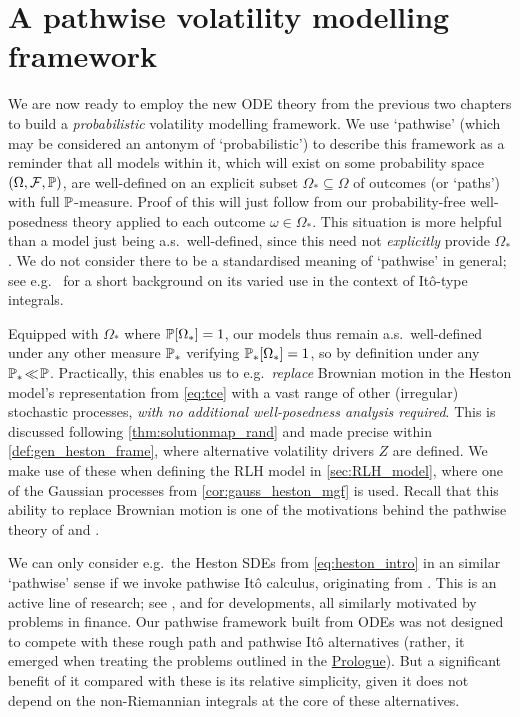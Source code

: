 \clearpage
\section{A pathwise volatility modelling framework}\label{chap:framework}

We are now ready to employ the new ODE theory from the previous two chapters to build a \emph{probabilistic} volatility modelling framework. We use `pathwise' (which may be considered an antonym of `probabilistic') to describe this framework as a reminder that all models within it, which will exist on some probability space $(\Omega,\mathcal{F},\mathbb{P})$, are well-defined on an explicit subset $\Omega_*\subseteq\Omega$ of outcomes (or `paths') with full $\mathbb{P}$-measure. Proof of this will just follow from our probability-free well-posedness theory applied to each outcome $\omega\in\Omega_*$. This situation is more helpful than a model just being a.s.~well-defined, since this need not \emph{explicitly} provide $\Omega_*$. We do not consider there to be a standardised meaning of `pathwise' in general; see e.g.~\cite{vovk_2016} for a short background on its varied use in the context of It\^o-type integrals.

Equipped with $\Omega_*$ where $\mathbb{P}[\Omega_*]=1$, our models thus remain a.s.~well-defined under any other measure $\mathbb{P}_*$ verifying $\mathbb{P}_*[\Omega_*]=1$, so by definition under any $\mathbb{P}_*\!\ll\!\mathbb{P}$. Practically, this enables us to e.g.~\emph{replace} Brownian motion in the Heston model's representation from \autoref{eq:tce} with a vast range of other (irregular) stochastic processes, \emph{with no additional well-posedness analysis required}. This is discussed following \autoref{thm:solutionmap_rand} and made precise within \autoref{def:gen_heston_frame}, where alternative volatility drivers $Z$ are defined. We make use of these when defining the RLH model in \autoref{sec:RLH_model}, where one of the Gaussian processes from \autoref{cor:gauss_heston_mgf} is used. Recall that this ability to replace Brownian motion is one of the motivations behind the pathwise theory of \cite{friz_2010} and \cite{friz_2014}.

We can only consider e.g.~the Heston SDEs from \autoref{eq:heston_intro} in an similar `pathwise' sense if we invoke pathwise It\^o calculus, originating from \cite{follmer_1981}. This is an active line of research; see \cite{davis_2018}, \cite{lochowski_2018} and \cite{cont_2019} for developments, all similarly motivated by problems in finance. Our pathwise framework built from ODEs was not designed to compete with these rough path and pathwise It\^o alternatives (rather, it emerged when treating the problems outlined in the \hyperlink{prologue}{Prologue}). But a significant benefit of it compared with these is its relative simplicity, given it does not depend on the non-Riemannian integrals at the core of these alternatives.

